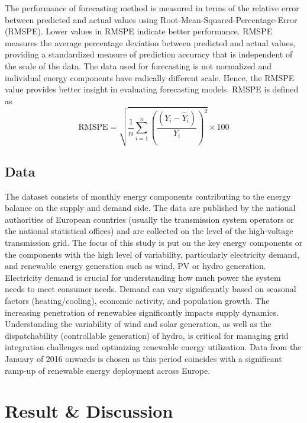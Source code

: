 \documentclass[acmtog]{acmart}
\begin{document}
The performance of forecasting method is measured in terms of the relative error between predicted and actual values using Root-Mean-Squared-Percentage-Error (RMSPE)\cite{botchkarev_performance_2019}. Lower values in RMSPE indicate better performance. RMSPE measures the average percentage deviation between predicted and actual values, providing a standardized measure of prediction accuracy that is independent of the scale of the data. The data used for forecasting is not normalized and individual energy components have radically different scale. Hence, the RMSPE value provides better insight in evaluating forecasting models. RMSPE is defined as
\begin{equation}
\text{RMSPE} = \sqrt{\frac{1}{n} \sum_{i=1}^{n} \left( \frac{(Y_i - \hat{Y}_i)}{Y_i} \right)^2} \times 100
\end{equation}

\subsection{Data}

The dataset consists of monthly energy components contributing to the energy balance on the supply and demand side. The data are published by the national authorities of European countries (usually the transmission system operators or the national statistical offices) and are collected on the level of the high-voltage transmission grid. The focus of this study is put on the key energy components or the components with the high level of variability, particularly electricity demand, and renewable energy generation such as wind, PV or hydro generation.  Electricity demand  is crucial for understanding how much power the system needs to meet consumer needs. Demand can vary significantly based on seasonal factors (heating/cooling), economic activity, and population growth. The increasing penetration of renewables significantly impacts supply dynamics. Understanding the variability of wind and solar generation, as well as the dispatchability (controllable generation) of hydro, is critical for managing grid integration challenges and optimizing renewable energy utilization. Data from the January of 2016 onwards is chosen as this period coincides with a significant ramp-up of renewable energy deployment across Europe. 

\section{Result \& Discussion}
\end{document}
